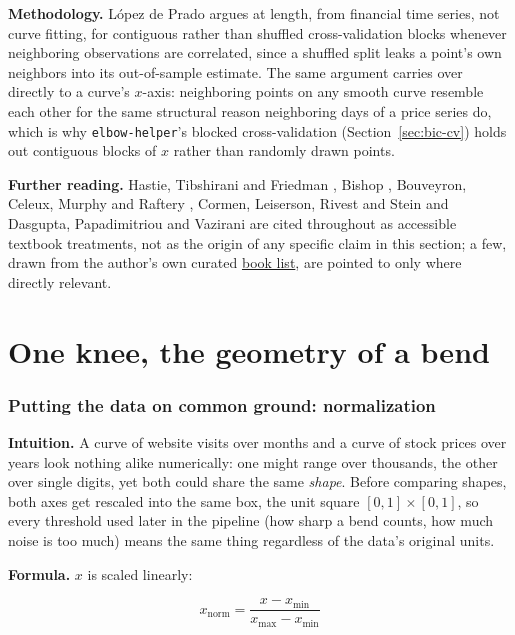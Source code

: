 \documentclass[11pt]{article}
\newcommand{\code}[1]{\texttt{#1}}
\begin{document}
\textbf{Methodology.} L\'opez de Prado \citep{lopezdeprado2018financial}
argues at length, from financial time series, not curve fitting, for
contiguous rather than shuffled cross-validation blocks whenever
neighboring observations are correlated, since a shuffled split leaks a
point's own neighbors into its out-of-sample estimate. The same argument
carries over directly to a curve's $x$-axis: neighboring points on any
smooth curve resemble each other for the same structural reason
neighboring days of a price series do, which is why \code{elbow-helper}'s
blocked cross-validation (Section~\ref{sec:bic-cv}) holds out contiguous
blocks of $x$ rather than randomly drawn points.

\textbf{Further reading.} Hastie, Tibshirani and Friedman
\citep{hastie2009esl}, Bishop \citep{bishop2006prml}, Bouveyron, Celeux,
Murphy and Raftery \citep{bouveyron2021mbc}, Cormen, Leiserson, Rivest and
Stein \citep{cormen2022algorithms} and Dasgupta, Papadimitriou and
Vazirani \citep{dasgupta2006algorithms} are cited throughout as accessible
textbook treatments, not as the origin of any specific claim in this
section; a few,
drawn from the author's own curated
\href{https://deraison.ai/ai-books}{book list}, are pointed to only where
directly relevant.

\clearpage

\part{One knee, the geometry of a bend}
\label{part:one}

\section{Putting the data on common ground: normalization}

\textbf{Intuition.} A curve of website visits over months and a curve of
stock prices over years look nothing alike numerically: one might range over
thousands, the other over single digits, yet both could share the same
\emph{shape}. Before comparing shapes, both axes get rescaled into the same
box, the unit square $[0,1] \times [0,1]$, so every threshold used later in
the pipeline (how sharp a bend counts, how much noise is too much)
means the same thing regardless of the data's original units.

\textbf{Formula.} $x$ is scaled linearly:

\begin{equation}
x_{\text{norm}} = \frac{x - x_{\min}}{x_{\max} - x_{\min}}
\end{equation}
\end{document}
